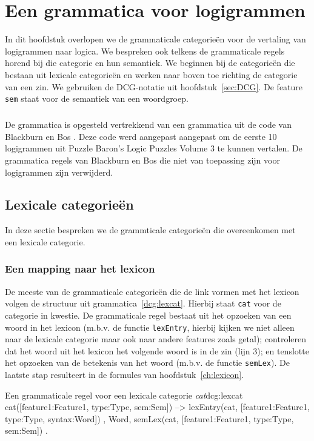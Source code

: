 \chapter{Een grammatica voor logigrammen}
\label{ch:grammatica}

In dit hoofdstuk overlopen we de grammaticale categorieën voor de vertaling van logigrammen naar logica. We bespreken ook telkens de grammaticale regels horend bij die categorie en hun semantiek. We beginnen bij de categorieën die bestaan uit lexicale categorieën en werken naar boven toe richting de categorie van een zin. We gebruiken de DCG-notatie uit hoofdstuk~\ref{sec:DCG}. De feature \texttt{sem} staat voor de semantiek van een woordgroep.

\paragraph{}De grammatica is opgesteld vertrekkend van een grammatica uit de code van Blackburn en Bos \cite{Blackburn2006}. Deze code werd aangepast aangepast om de eerste 10 logigrammen uit Puzzle Baron's Logic Puzzles Volume 3 \cite{logigrammen} te kunnen vertalen. De grammatica regels van Blackburn en Bos die niet van toepassing zijn voor logigrammen zijn verwijderd.

\section{Lexicale categorieën}
In deze sectie bespreken we de grammticale categorieën die overeenkomen met een lexicale categorie.

\subsection{Een mapping naar het lexicon}
\label{sec:lexgram}
De meeste van de grammaticale categorieën die de link vormen met het lexicon volgen de structuur uit grammatica~\ref{dcg:lexcat}. Hierbij staat \texttt{cat} voor de categorie in kwestie. De grammaticale regel bestaat uit het opzoeken van een woord in het lexicon (m.b.v. de functie \texttt{lexEntry}, hierbij kijken we niet alleen naar de lexicale categorie maar ook naar andere features zoals getal); controleren dat het woord uit het lexicon het volgende woord is in de zin (lijn 3); en tenslotte het opzoeken van de betekenis van het woord (m.b.v. de functie \texttt{semLex}). De laatste stap resulteert in de formules van hoofdstuk~\ref{ch:lexicon}.

\begin{dcg}{Een grammaticale regel voor een lexicale categorie \textit{cat}}{dcg:lexcat}
cat([feature1:Feature1, type:Type, sem:Sem]) -->
  { lexEntry(cat, [feature1:Feature1, type:Type, syntax:Word]) },
  Word,
  { semLex(cat, [feature1:Feature1, type:Type, sem:Sem]) }.
\end{dcg}


